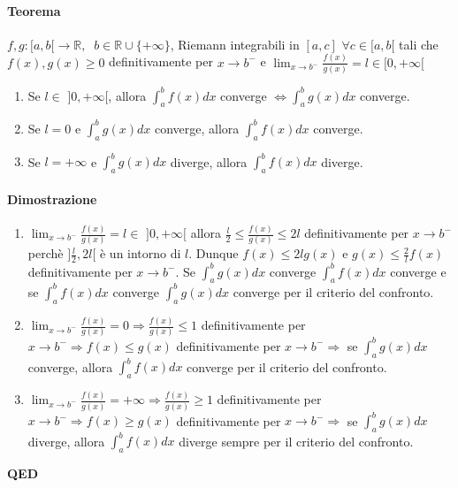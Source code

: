 \documentclass{article}
\newcommand{\R}{\mathbb{R}}
\begin{document}
\paragraph{{Teorema}}
$f,g: [a,b[\rightarrow \R, \,\,\ b\in \R \cup \{+\infty\}$, Riemann integrabili in $[a,c] \,\, \forall c \in [a,b[$ tali che $f(x),g(x)\geq 0$ definitivamente per $x \rightarrow b^-$ e $\lim_{x \rightarrow b^-} \frac{f(x)}{g(x)}=l \in [0,+\infty[$
\begin{enumerate}
    \item Se $l \in \,\, ]0,+\infty[$, allora $ \int_{a}^{b} f(x) dx$ converge $\Leftrightarrow \int_{a}^{b} g(x) dx$ converge.
    \item Se $l=0$ e $\int_{a}^{b} g(x)dx $ converge, allora $\int_{a}^{b} f(x) dx$ converge.
    \item Se $l=+\infty$ e $\int_{a}^{b} g(x) dx$ diverge, allora $\int_{a}^{b} f(x)dx$ diverge.
\end{enumerate}

\paragraph{Dimostrazione}
\begin{enumerate}
    \item $\lim_{x \rightarrow b^-}\frac{f(x)}{g(x)} = l \in \,\, ]0,+\infty[$ allora $\frac{l}{2}\leq \frac{f(x)}{g(x)}\leq 2l$ definitivamente per $x \rightarrow b^-$ perchè $]\frac{l}{2},2l[$ è un intorno di $l$. Dunque $f(x)\leq 2lg(x)$ e $g(x)\leq \frac{2}{l} f(x)$ definitivamente per $x \rightarrow b^-$. Se $\int_{a}^{b} g(x) dx$ converge $\int_{a}^{b} f(x) dx$ converge e se $\int_{a}^{b} f(x) dx$ converge $\int_{a}^{b} g(x) dx$ converge per il criterio del confronto.
    \item $\lim_{x \rightarrow b^-} \frac{f(x)}{g(x)} = 0 \Rightarrow \frac{f(x)}{g(x)} \leq 1 $ definitivamente per $x\rightarrow b^- \Rightarrow f(x) \leq g(x)$ definitivamente per $x\rightarrow b^- \Rightarrow $ se $\int_{a}^{b} g(x)dx$ converge, allora $\int_{a}^{b} f(x)dx$ converge per il criterio del confronto.
    \item $\lim_{x \rightarrow b^-}\frac{f(x)}{g(x)} = +\infty \Rightarrow \frac{f(x)}{g(x)} \geq 1$ definitivamente per $x \rightarrow b^- \Rightarrow f(x) \geq g(x)$ definitivamente per $x \rightarrow b^- \Rightarrow$ se $\int_{a}^{b} g(x)dx$ diverge, allora $\int_{a}^{b} f(x)dx$ diverge sempre per il criterio del confronto.
\end{enumerate}
\begin{flushright}
\textbf{QED}
\end{flushright}
\end{document}
